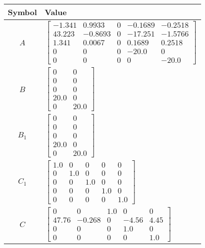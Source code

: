 \begin{tabular}{cl}
\hline
  Symbol  & Value                                                                                                                                                                                                          \\
\hline
   $A$    & $\left[\begin{matrix}-1.341 & 0.9933 & 0 & -0.1689 & -0.2518\\43.223 & -0.8693 & 0 & -17.251 & -1.5766\\1.341 & 0.0067 & 0 & 0.1689 & 0.2518\\0 & 0 & 0 & -20.0 & 0\\0 & 0 & 0 & 0 & -20.0\end{matrix}\right]$ \\
   $B$    & $\left[\begin{matrix}0 & 0\\0 & 0\\0 & 0\\20.0 & 0\\0 & 20.0\end{matrix}\right]$                                                                                                                               \\
 $B_{1}$  & $\left[\begin{matrix}0 & 0\\0 & 0\\0 & 0\\20.0 & 0\\0 & 20.0\end{matrix}\right]$                                                                                                                               \\
 $C_{1}$  & $\left[\begin{matrix}1.0 & 0 & 0 & 0 & 0\\0 & 1.0 & 0 & 0 & 0\\0 & 0 & 1.0 & 0 & 0\\0 & 0 & 0 & 1.0 & 0\\0 & 0 & 0 & 0 & 1.0\end{matrix}\right]$                                                               \\
   $C$    & $\left[\begin{matrix}0 & 0 & 1.0 & 0 & 0\\47.76 & -0.268 & 0 & -4.56 & 4.45\\0 & 0 & 0 & 1.0 & 0\\0 & 0 & 0 & 0 & 1.0\end{matrix}\right]$                                                                      \\

\end{tabular}
